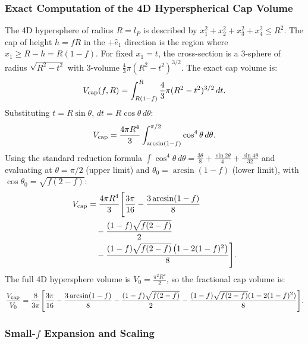 \documentclass[11pt,letterpaper]{article}
\begin{document}
\subsubsection{Exact Computation of the 4D Hyperspherical Cap Volume}

The 4D hypersphere of radius $R = l_P$ is described by 
$x_1^2 + x_2^2 + x_3^2 + x_4^2 \leq R^2$. The cap of height 
$h = fR$ in the $+\hat{e}_1$ direction is the region where 
$x_1 \geq R - h = R(1-f)$. For fixed $x_1 = t$, the cross-section is a 3-sphere of radius $\sqrt{R^2 - t^2}$ with 3-volume $\frac{4}{3}\pi(R^2-t^2)^{3/2}$. The exact cap volume is:
\begin{equation}
V_{\rm cap}(f,R) = \int_{R(1-f)}^{R} \frac{4}{3}\pi(R^2-t^2)^{3/2}\,dt.
\label{eq:cap_integral}
\end{equation}
Substituting $t = R\sin\theta$, $dt = R\cos\theta\,d\theta$:
\begin{equation}
V_{\rm cap} = \frac{4\pi R^4}{3}\int_{\arcsin(1-f)}^{\pi/2}
\cos^4\theta\,d\theta.
\label{eq:cap_theta}
\end{equation}
Using the standard reduction formula 
$\int\cos^4\theta\,d\theta = \frac{3\theta}{8} + \frac{\sin 2\theta}{4} 
+ \frac{\sin 4\theta}{32}$ and evaluating at $\theta = \pi/2$ 
(upper limit) and $\theta_0 = \arcsin(1-f)$ (lower limit), with 
$\cos\theta_0 = \sqrt{f(2-f)}$:
\begin{align}
V_{\rm cap} &= \frac{4\pi R^4}{3}\Bigg[\frac{3\pi}{16} 
- \frac{3\arcsin(1-f)}{8} \nonumber \\
&\quad - \frac{(1-f)\sqrt{f(2-f)}}{2} \nonumber \\
&\quad - \frac{(1-f)\sqrt{f(2-f)}\left(1-2(1-f)^2\right)}{8}
\Bigg].
\label{eq:cap_exact}
\end{align}
The full 4D hypersphere volume is $V_0 = \frac{\pi^2 R^4}{2}$, so the 
fractional cap volume is:
\begin{equation}
\frac{V_{\rm cap}}{V_0} = \frac{8}{3\pi}\Bigg[\frac{3\pi}{16} 
- \frac{3\arcsin(1-f)}{8} - \frac{(1-f)\sqrt{f(2-f)}}{2} 
- \frac{(1-f)\sqrt{f(2-f)}(1-2(1-f)^2)}{8}\Bigg].
\label{eq:cap_fraction}
\end{equation}

\subsubsection{Small-$f$ Expansion and Scaling}
\end{document}
